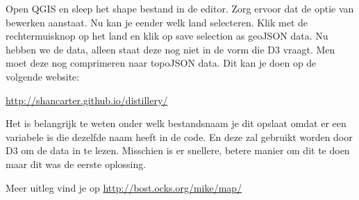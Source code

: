 Open QGIS en sleep het shape bestand in de editor. Zorg ervoor dat de optie van bewerken aanstaat. Nu kan je eender welk land selecteren. Klik met de rechtermuisknop op het land en klik op save selection as geoJSON data. Nu hebben we de data, alleen staat deze nog niet in de vorm die D3 vraagt. Men moet deze nog comprimeren naar topoJSON data. Dit kan je doen op de volgende website:

\url{http://shancarter.github.io/distillery/}

Het is belangrijk te weten onder welk bestandsnaam je dit opslaat omdat er een variabele is die dezelfde naam heeft in de code. En deze zal gebruikt worden door D3 om de data in te lezen. Misschien is er snellere, betere manier om dit te doen maar dit was de eerste oplossing.

Meer uitleg vind je op \url{http://bost.ocks.org/mike/map/}